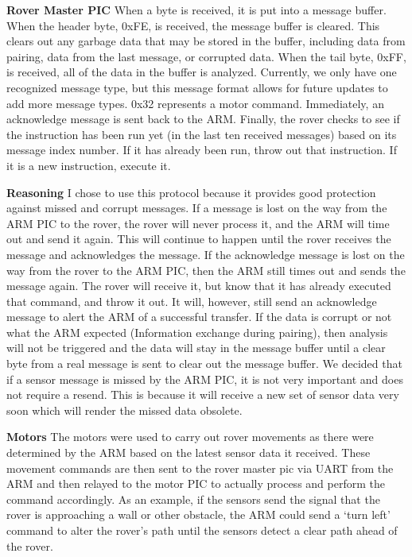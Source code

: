 {\textbf{Rover Master PIC}
When a byte is received, it is put into a message buffer. When the header byte, 0xFE, is received, the message buffer is cleared. This clears out any garbage data that may be stored in the buffer, including data from pairing, data from the last message, or corrupted data. When the tail byte, 0xFF, is received, all of the data in the buffer is analyzed.
Currently, we only have one recognized message type, but this message format allows for future updates to add more message types. 0x32 represents a motor command. Immediately, an acknowledge message is sent back to the ARM.
Finally, the rover checks to see if the instruction has been run yet (in the last ten received messages) based on its message index number. If it has already been run, throw out that instruction. If it is a new instruction, execute it.

\textbf{Reasoning}
I chose to use this protocol because it provides good protection against missed and corrupt messages.
If a message is lost on the way from the ARM PIC to the rover, the rover will never process it, and the ARM will time out and send it again. This will continue to happen until the rover receives the message and acknowledges the message.
If the acknowledge message is lost on the way from the rover to the ARM PIC, then the ARM still times out and sends the message again. The rover will receive it, but know that it has already executed that command, and throw it out. It will, however, still send an acknowledge message to alert the ARM of a successful transfer.
If the data is corrupt or not what the ARM expected (Information exchange during pairing), then analysis will not be triggered and the data will stay in the message buffer until a clear byte from a real message is sent to clear out the message buffer.
We decided that if a sensor message is missed by the ARM PIC, it is not very important and does not require a resend. This is because it will receive a new set of sensor data very soon which will render the missed data obsolete.

\textbf{Motors}
The motors were used to carry out rover movements as there were determined by the ARM based on the latest sensor data it received.  These movement commands are then sent to the rover master pic via UART from the ARM and then relayed to the motor PIC to actually process and perform the command accordingly.  As an example, if the sensors send the signal that the rover is approaching a wall or other obstacle, the ARM could send a ‘turn left’ command to alter the rover’s path until the sensors detect a clear path ahead of the rover.  

}
